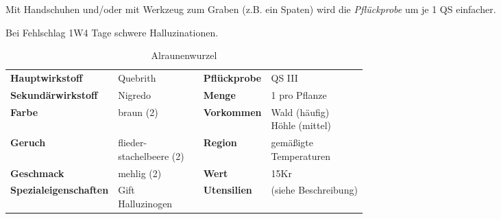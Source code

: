 Mit Handschuhen und/oder mit Werkzeug zum Graben (z.B. ein Spaten) wird die \textit{Pflückprobe} um je 1 QS einfacher.

Bei Fehlschlag 1W4 Tage schwere Halluzinationen.

\begin{table}[h] 
\begin{center} 
\begin{tabular}{|l|l|p{1cm}|l|l|} 
  	\cline{1-2} \cline{4-5} 
  	\textbf{Hauptwirkstoff} & Quebrith && \textbf{Pflückprobe} & QS III \\ \cline{1-2} \cline{4-5} 
  	\textbf{Sekundärwirkstoff} & Nigredo && \textbf{Menge} & 1 pro Pflanze \\ \cline{1-2} \cline{4-5} 
  	\textbf{Farbe} & braun (2) && \textbf{Vorkommen} & \brcell{Wald (häufig) \\ Höhle (mittel)} \\ \cline{1-2} \cline{4-5} 
  	\textbf{Geruch} & \brcell{flieder- \\ stachelbeere (2)} && \textbf{Region} & \brcell{gemäßigte \\ Temperaturen} \\ \cline{1-2} \cline{4-5} 
  	\textbf{Geschmack} & mehlig (2) && \textbf{Wert} & 15Kr \\ \cline{1-2} \cline{4-5} 
  	\textbf{Spezialeigenschaften} & \brcell{Gift \\ Halluzinogen} && \textbf{Utensilien} & (siehe Beschreibung) \\ \cline{1-2} \cline{4-5} 
\end{tabular} 
\end{center} 
\caption{Alraunenwurzel} 
\label{tab:alraunenwurzel} 
\end{table}


